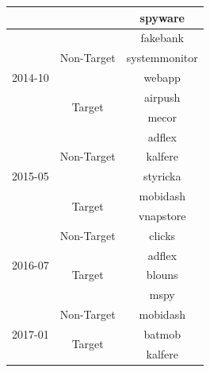 \documentclass[conference,compsoc]{IEEEtran} %
\begin{document}
\begin{itemize}[leftmargin=*]
\begin{table}[ht!]
\begin{center}
\begin{tabular}{ccc}
				&   & spyware  \\
				\midrule
				\multirow{5}{*}{2014-10} & \multirow{3}{*}{Non-Target} 	& fakebank \\ 
				&	& systemmonitor \\
				&   & webapp  \\ \cline{2-3}
				& \multirow{2}{*}{Target} 	& airpush \\
				&   & mecor  \\
				\midrule
				\multirow{5}{*}{2015-05} & \multirow{3}{*}{Non-Target} 	& adflex \\ 
				&	& kalfere \\
				&   & styricka  \\ \cline{2-3}
				& \multirow{2}{*}{Target} 	& mobidash \\
				&   & vnapstore  \\
				\midrule
				\multirow{4}{*}{2016-07} & \multirow{1}{*}{Non-Target} 	& clicks \\  \cline{2-3}
				& \multirow{3}{*}{Target} 	& adflex \\
				&   & blouns  \\
				&   & mspy    \\
				\midrule
				\multirow{3}{*}{2017-01} & \multirow{1}{*}{Non-Target} 	& mobidash \\  \cline{2-3}
				& \multirow{2}{*}{Target} 	& batmob \\
				&   & kalfere  \\
				\midrule
			\end{tabular}
		\end{center}
	\end{table}


\end{itemize}
\end{document}
